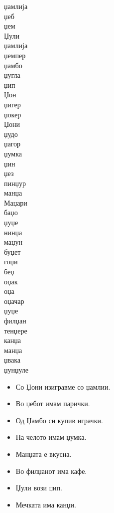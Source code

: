 \documentclass[a5paper,12pt]{article}
\newenvironment{activity}[1]{%
  \begin{tcolorbox}[colback=boxcolor,colframe=titlecolor,title={\textbf{#1}},fonttitle=\bfseries]
}{%
  \end{tcolorbox}
}
\begin{document}
\begin{activity}{Зборчиња}
\begin{multicols}{4}
џамлија\\ џеб\\ џем\\ Џули\\ џамлија\\ џемпер\\ џамбо\\ џугла\\ џип\\ Џон\\ џигер\\ џокер\\ Џони\\ џудо\\ џагор\\ џумка\\ џин\\ џез\\ пинџур\\
манџа\\ Маџари\\ баџо\\ џуџе\\ нинџа\\ маџун\\ буџет\\ гоџи\\ беџ\\ оџак\\ оџа\\ оџачар\\ џуџе\\ филџан\\ тенџере\\ канџа\\ манџа\\ џвака\\ џунџуле
\end{multicols}
\end{activity}

\begin{itemize}
  \item Со Џони изигравме со џамлии. 
  \item Во џебот имам парички. 
  \item Од Џамбо си купив играчки. 
  \item На челото имам џумка. 
  \item Манџата е вкусна. 
  \item Во филџанот има кафе. 
  \item Џули вози џип. 
  \item Мечката има канџи.
\end{itemize}
\end{document}
